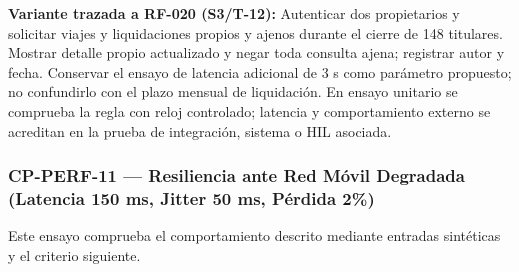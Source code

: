 \par\noindent\textbf{Variante trazada a RF-020 (S3/T-12):} Autenticar dos propietarios y solicitar viajes y liquidaciones propios y ajenos durante el cierre de 148 titulares. Mostrar detalle propio actualizado y negar toda consulta ajena; registrar autor y fecha. Conservar el ensayo de latencia adicional de 3 s como parámetro propuesto; no confundirlo con el plazo mensual de liquidación. En ensayo unitario se comprueba la regla con reloj controlado; latencia y comportamiento externo se acreditan en la prueba de integración, sistema o HIL asociada.\par
\subsubsection*{CP-PERF-11 — Resiliencia ante Red Móvil Degradada (Latencia 150 ms, Jitter 50 ms, Pérdida 2\%)}\label{sec:9-cp-perf-11}
Este ensayo comprueba el comportamiento descrito mediante entradas sintéticas y el criterio siguiente.


